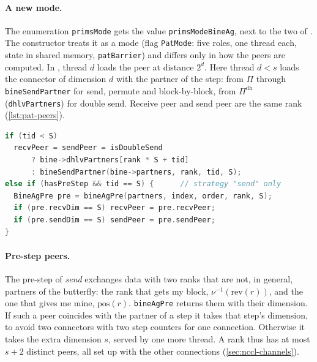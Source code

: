 \paragraph{A new mode.}
The enumeration \texttt{primsMode} gets the value \texttt{primsModeBineAg}, next to the two of \pat{}.
The constructor treats it as a \pat{} mode (flag \texttt{PatMode}: five roles, one thread each, state in shared memory, \texttt{patBarrier}) and differs only in how the peers are computed.
In \pat{}, thread $d$ loads the peer at distance $2^d$.
Here thread $d<s$ loads the connector of dimension $d$ with the partner of the step: from $\Pi$ through \texttt{bineSendPartner} for send, permute and block-by-block, from $\Pi^{\mathrm{dh}}$ (\texttt{dhlvPartners}) for double send.
Receive peer and send peer are the same rank (\cref{lst:pat-peers}).
\begin{lstlisting}[language=C++,caption={Peers of the \texttt{primsModeBineAg} mode (simplified).},label={lst:pat-peers}]
if (tid < S)
  recvPeer = sendPeer = isDoubleSend
      ? bine->dhlvPartners[rank * S + tid]
      : bineSendPartner(bine->partners, rank, tid, S);
else if (hasPreStep && tid == S) {      // strategy "send" only
  BineAgPre pre = bineAgPre(partners, index, order, rank, S);
  if (pre.recvDim == S) recvPeer = pre.recvPeer;
  if (pre.sendDim == S) sendPeer = pre.sendPeer;
}
\end{lstlisting}

\paragraph{Pre-step peers.}
The pre-step of \emph{send} exchanges data with two ranks that are not, in general, partners of the butterfly: the rank that gets my block, $\nu^{-1}(\mathrm{rev}(r))$, and the one that gives me mine, $\mathrm{pos}(r)$.
\texttt{bineAgPre} returns them with their dimension.
If such a peer coincides with the partner of a step it takes that step's dimension, to avoid two connectors with two step counters for one connection. Otherwise it takes the extra dimension $s$, served by one more thread.
A rank thus has at most $s+2$ distinct peers, all set up with the other \bine{} connections (\cref{sec:nccl-channels}).

